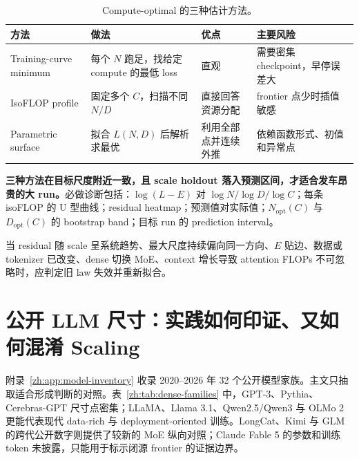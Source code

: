 \documentclass[UTF8,10pt,a4paper,fontset=none]{ctexart}
\begin{document}
\begin{table}[htbp]
\centering
\caption{Compute-optimal 的三种估计方法。}
\label{zh:tab:fit-methods}
\begin{tabularx}{\textwidth}{Y Y Y Y}
\toprule
方法 & 做法 & 优点 & 主要风险 \\
\midrule
Training-curve minimum & 每个 $N$ 跑足，找给定 compute 的最低 loss & 直观 & 需要密集 checkpoint，早停误差大 \\
IsoFLOP profile & 固定多个 $C$，扫描不同 $N/D$ & 直接回答资源分配 & frontier 点少时插值敏感 \\
Parametric surface & 拟合 $L(N,D)$ 后解析求最优 & 利用全部点并连续外推 & 依赖函数形式、初值和异常点 \\
\bottomrule
\end{tabularx}
\end{table}

\textbf{三种方法在目标尺度附近一致，且 scale holdout 落入预测区间，才适合发车昂贵的大 run。}必做诊断包括：$\log(L-E)$ 对 $\log N/\log D/\log C$；每条 isoFLOP 的 U 型曲线；residual heatmap；预测值对实际值；$N_{\mathrm{opt}}(C)$ 与 $D_{\mathrm{opt}}(C)$ 的 bootstrap band；目标 run 的 prediction interval。

当 residual 随 scale 呈系统趋势、最大尺度持续偏向同一方向、$E$ 贴边、数据或 tokenizer 已改变、dense 切换 MoE、context 增长导致 attention FLOPs 不可忽略时，应判定旧 law 失效并重新拟合。

\section{公开 LLM 尺寸：实践如何印证、又如何混淆 Scaling}

附录~\ref{zh:app:model-inventory} 收录 2020--2026 年 32 个公开模型家族。主文只抽取适合形成判断的对照。表~\ref{zh:tab:dense-families} 中，GPT-3、Pythia、Cerebras-GPT 尺寸点密集；LLaMA、Llama 3.1、Qwen2.5/Qwen3 与 OLMo 2 更能代表现代 data-rich 与 deployment-oriented 训练。LongCat、Kimi 与 GLM 的跨代公开数字则提供了较新的 MoE 纵向对照；Claude Fable 5 的参数和训练 token 未披露，只能用于标示闭源 frontier 的证据边界。
\end{document}
